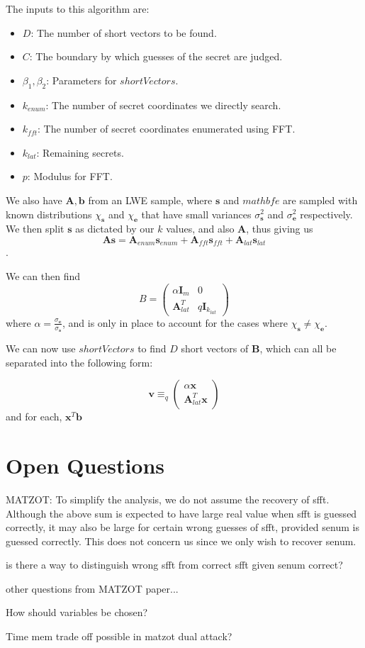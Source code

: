 \documentclass[a4paper, 10pt]{article}
\theoremstyle{definition}
\begin{document}
The inputs to this algorithm are:
\begin{itemize}
    \item $D$: The number of short vectors to be found.
    \item $C$: The boundary by which guesses of the secret are judged.
    \item $\beta _1, \beta _2$: Parameters for $shortVectors$.
    \item $k_{enum}$: The number of secret coordinates we directly search.
    \item $k_{fft}$: The number of secret coordinates enumerated using \ac{FFT}.
    \item $k_{lat}$: Remaining secrets.
    \item $p$: Modulus for FFT.
\end{itemize}

We also have $\mathbf{A, b}$ from an \ac{LWE} sample, where $\mathbf{s}$ and $mathbf{e}$ are sampled with known distributions $\chi _\mathbf{s}$ and $\chi _\mathbf{e}$ that have small variances $\sigma ^2_\mathbf{s}$ and $\sigma ^2_\mathbf{e}$ respectively. We then split $\mathbf{s}$ as dictated by our $k$ values, and also $\mathbf{A}$, thus giving us 
\[\mathbf{As} = \mathbf{A}_{enum}\mathbf{s}_{enum} + \mathbf{A}_{fft}\mathbf{s}_{fft} + \mathbf{A}_{lat}\mathbf{s}_{lat}\].

We can then find 
    \[B = \begin{pmatrix}
    \alpha \mathbf{I}_m & 0\\
    \mathbf{A}^T_{lat} & q \mathbf{I}_{k_{lat}}
\end{pmatrix}\]
where $\alpha = \frac{\sigma _\mathbf{e}}{\sigma _\mathbf{s}}$, and is only in place to account for the cases where $\chi _{\mathbf{s}} \neq \chi _{\mathbf{e}}$.

We can now use $shortVectors$ to find $D$ short vectors of $\mathbf{B}$, which can all be separated into the following form:

\[\mathbf{v} \equiv _q \begin{pmatrix}
\alpha \mathbf{x} \\
\mathbf{A}^T_{lat}\mathbf{x}
\end{pmatrix}\]
and for each, $\mathbf{x}^T\mathbf{b}$

\section{Open Questions}
MATZOT: To simplify the analysis, we do not assume the recovery of sfft. Although the above
sum is expected to have large real value when sfft is guessed correctly, it may also be
large for certain wrong guesses of sfft, provided senum is guessed correctly. This does
not concern us since we only wish to recover senum.

is there a way to distinguish wrong sfft from correct sfft given senum correct?

other questions from MATZOT paper...


How should variables be chosen?

Time mem trade off possible in matzot dual attack?
\end{document}
